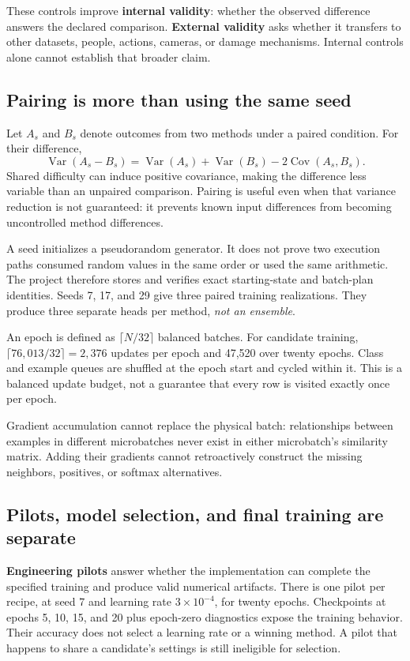 These controls improve \textbf{internal validity}: whether the observed
difference answers the declared comparison. \textbf{External validity} asks
whether it transfers to other datasets, people, actions, cameras, or damage
mechanisms. Internal controls alone cannot establish that broader claim.

\subsection{Pairing is more than using the same seed}
Let $A_s$ and $B_s$ denote outcomes from two methods under a paired condition.
For their difference,
\[
 \operatorname{Var}(A_s-B_s)
 =\operatorname{Var}(A_s)+\operatorname{Var}(B_s)
  -2\operatorname{Cov}(A_s,B_s).
\]
Shared difficulty can induce positive covariance, making the difference less
variable than an unpaired comparison. Pairing is useful even when that variance
reduction is not guaranteed: it prevents known input differences from becoming
uncontrolled method differences.

A seed initializes a pseudorandom generator. It does not prove two execution
paths consumed random values in the same order or used the same arithmetic.
The project therefore stores and verifies exact starting-state and batch-plan
identities. Seeds 7, 17, and 29 give three paired training realizations.
They produce three separate heads per method, \emph{not an ensemble}.

An epoch is defined as $\lceil N/32\rceil$ balanced batches. For candidate
training, $\lceil76{,}013/32\rceil=2{,}376$ updates per epoch and 47,520 over
twenty epochs. Class and example queues are shuffled at the epoch start and
cycled within it. This is a balanced update budget, not a guarantee that every
row is visited exactly once per epoch.

Gradient accumulation cannot replace the physical batch: relationships between
examples in different microbatches never exist in either microbatch's similarity
matrix. Adding their gradients cannot retroactively construct the missing
neighbors, positives, or softmax alternatives.

\subsection{Pilots, model selection, and final training are separate}
\textbf{Engineering pilots} answer whether the implementation can complete the
specified training and produce valid numerical artifacts. There is one pilot
per recipe, at seed 7 and learning rate $3\times10^{-4}$, for twenty epochs.
Checkpoints at epochs 5, 10, 15, and 20 plus epoch-zero diagnostics expose the
training behavior. Their accuracy does not select a learning rate or a winning
method. A pilot that happens to share a candidate's settings is still ineligible
for selection.

